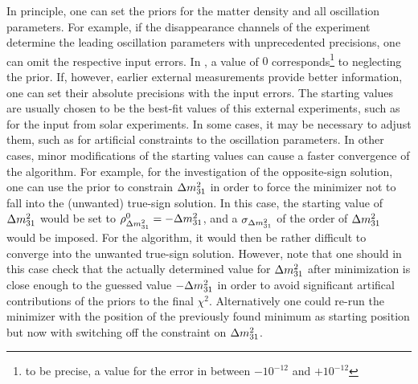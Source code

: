 In principle, one can set the priors for the matter density and all oscillation parameters. For example, if the disappearance channels of the experiment determine the leading oscillation parameters with unprecedented
precisions, one can omit the respective input errors. In \GLOBES , a
value of $0$ corresponds\footnote{to be precise, a value for the error
in between $-10^{-12}$ and $+10^{-12}$} to neglecting the prior. If, however,
 earlier external measurements provide better information, one can set their 
absolute precisions with the input errors. The starting values are usually 
chosen to be the best-fit values of this external experiments, such as
for the input from solar experiments. In some cases, it may be
necessary to adjust them, such as for artificial constraints to the
oscillation parameters. In other cases, minor modifications of the 
starting values can cause a faster convergence of the algorithm.
For example, for the investigation of the
opposite-sign solution, one can use the prior to constrain $\Delta m_{31}^2$
in order to force the minimizer not to  fall into the (unwanted) 
true-sign solution. In this case, the starting value of $\Delta m_{31}^2$ would 
be set to $\rho^0_{\Delta m_{31}^2} = - \Delta m_{31}^2$, and a $\sigma_{\Delta m_{31}^2}$ of the order 
of $\Delta m_{31}^2$ would be imposed. For the algorithm, it would 
then be rather difficult 
to converge into the unwanted true-sign solution. However, note that 
one should in this case check that the actually determined value 
for $\Delta m_{31}^2$ after minimization is close enough to the guessed value $-\Delta m_{31}^2$ 
in order to avoid significant artifical contributions of the priors to the 
final $\chi^2$. Alternatively one could re-run the minimizer with the
position of the previously found minimum as starting position but now
with switching off the constraint on $\Delta m_{31}^2$.

